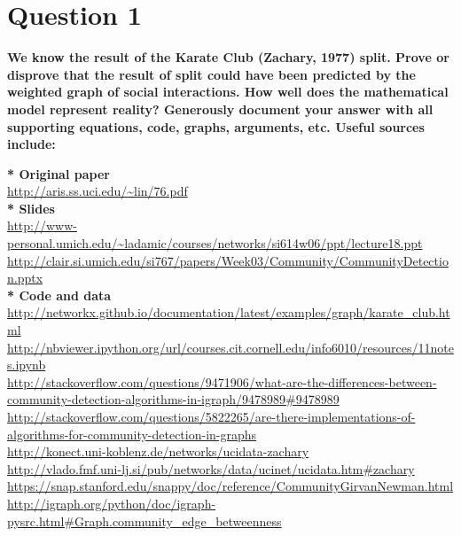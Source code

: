 \chapter{Question 1}
\label{intro}

\textbf{We know the result of the Karate Club (Zachary, 1977) split. Prove or disprove that the result of split could have been predicted by the weighted graph of social interactions.  How well does the mathematical model represent reality?
Generously document your answer with all supporting equations, code, graphs, arguments, etc.
Useful sources include:}

\textbf{* Original paper}\\
\url{http://aris.ss.uci.edu/~lin/76.pdf}\\
\textbf{* Slides}\\
\url{http://www-personal.umich.edu/~ladamic/courses/networks/si614w06/ppt/lecture18.ppt}\\
\url{http://clair.si.umich.edu/si767/papers/Week03/Community/CommunityDetection.pptx}\\
\textbf{* Code and data}\\
\url{http://networkx.github.io/documentation/latest/examples/graph/karate_club.html}\\
\url{http://nbviewer.ipython.org/url/courses.cit.cornell.edu/info6010/resources/11notes.ipynb}\\
\url{http://stackoverflow.com/questions/9471906/what-are-the-differences-between-community-detection-algorithms-in-igraph/9478989#9478989}\\
\url{http://stackoverflow.com/questions/5822265/are-there-implementations-of-algorithms-for-community-detection-in-graphs}\\
\url{http://konect.uni-koblenz.de/networks/ucidata-zachary}\\
\url{http://vlado.fmf.uni-lj.si/pub/networks/data/ucinet/ucidata.htm#zachary}\\
\url{https://snap.stanford.edu/snappy/doc/reference/CommunityGirvanNewman.html}\\
\url{http://igraph.org/python/doc/igraph-pysrc.html#Graph.community_edge_betweenness}

